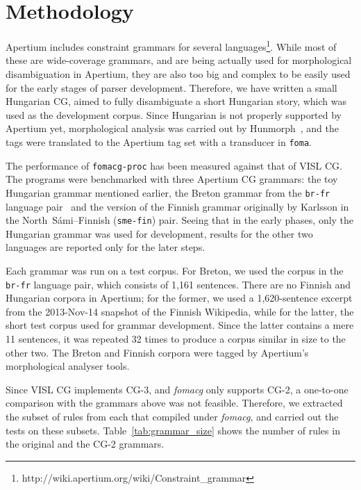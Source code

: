 \documentclass[11pt]{article}
\begin{document}

\section{Methodology}
\label{sec:methodology}

Apertium includes constraint grammars for several
languages\footnote{http://wiki.apertium.org/wiki/Constraint\_grammar}. While
most of these are wide-coverage grammars, and are being actually used for morphological
disambiguation in Apertium, they are also too big and complex to be easily used
for the early stages of parser development. Therefore, we have written a small
Hungarian CG, aimed to fully disambiguate a short Hungarian story, which was used
as the development corpus. Since Hungarian is not properly supported by Apertium
yet, morphological analysis was carried out by Hunmorph~\cite{Tron:2005}, and
the tags were translated to the Apertium tag set with a transducer in \texttt{foma}.

The performance of \texttt{fomacg-proc} has been measured against that of
VISL CG. The programs were benchmarked with three Apertium CG grammars: the toy
Hungarian grammar mentioned earlier, the Breton grammar from the \texttt{br-fr}
language pair~\cite{Tyers:2010} and the version of the Finnish grammar originally
by Karlsson in the North~Sámi--Finnish (\texttt{sme-fin}) pair. %
Seeing that in the early phases, only the Hungarian grammar was used for
development, results for the other two languages are reported only for the later
steps.

Each grammar was run on a test corpus. For Breton, we used the corpus
in the \texttt{br-fr} language pair, which consists of 1,161 sentences. There
are no Finnish and Hungarian corpora in Apertium; for the former, we used a
1,620-sentence excerpt from the 2013-Nov-14 snapshot of the Finnish Wikipedia,
while for the latter, the short test corpus used for grammar development. Since
the latter contains a mere 11 sentences, it was repeated 32 times to produce
a corpus similar in size to the other two. The Breton and Finnish corpora
were tagged by Apertium's morphological analyser tools.

Since VISL CG implements CG-3, and \emph{fomacg} only supports CG-2, a one-to-one
comparison with the grammars above was not feasible. Therefore, we extracted the
subset of rules from each that compiled under \emph{fomacg}, and carried out the tests
on these subsets. Table~\ref{tab:grammar_size} shows the number of rules in the
original and the CG-2 grammars.
\end{document}
